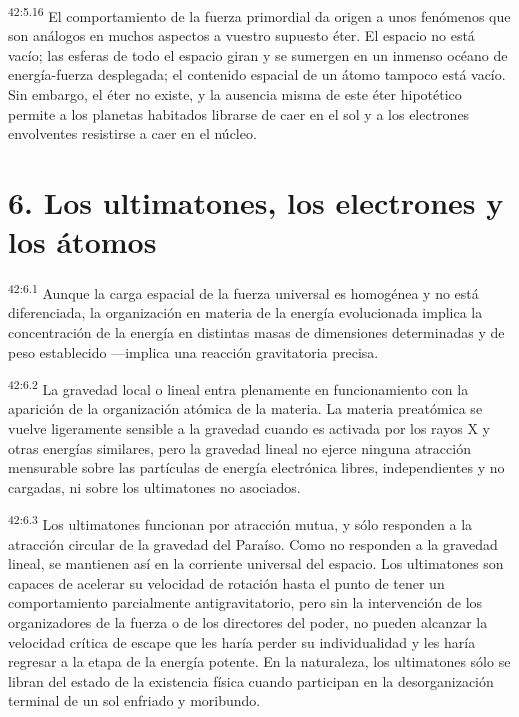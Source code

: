 \par
\textsuperscript{42:5.16} El comportamiento de la fuerza primordial da origen a unos fenómenos que son análogos en muchos aspectos a vuestro supuesto éter. El espacio no está vacío; las esferas de todo el espacio giran y se sumergen en un inmenso océano de energía-fuerza desplegada; el contenido espacial de un átomo tampoco está vacío. Sin embargo, el éter no existe, y la ausencia misma de este éter hipotético permite a los planetas habitados librarse de caer en el sol y a los electrones envolventes resistirse a caer en el núcleo.

\section*{6. Los ultimatones, los electrones y los átomos}
\par
\textsuperscript{42:6.1} Aunque la carga espacial de la fuerza universal es homogénea y no está diferenciada, la organización en materia de la energía evolucionada implica la concentración de la energía en distintas masas de dimensiones determinadas y de peso establecido ---implica una reacción gravitatoria precisa.

\par
\textsuperscript{42:6.2} La gravedad local o lineal entra plenamente en funcionamiento con la aparición de la organización atómica de la materia. La materia preatómica se vuelve ligeramente sensible a la gravedad cuando es activada por los rayos X y otras energías similares, pero la gravedad lineal no ejerce ninguna atracción mensurable sobre las partículas de energía electrónica libres, independientes y no cargadas, ni sobre los ultimatones no asociados.

\par
\textsuperscript{42:6.3} Los ultimatones funcionan por atracción mutua, y sólo responden a la atracción circular de la gravedad del Paraíso. Como no responden a la gravedad lineal, se mantienen así en la corriente universal del espacio. Los ultimatones son capaces de acelerar su velocidad de rotación hasta el punto de tener un comportamiento parcialmente antigravitatorio, pero sin la intervención de los organizadores de la fuerza o de los directores del poder, no pueden alcanzar la velocidad crítica de escape que les haría perder su individualidad y les haría regresar a la etapa de la energía potente. En la naturaleza, los ultimatones sólo se libran del estado de la existencia física cuando participan en la desorganización terminal de un sol enfriado y moribundo.

